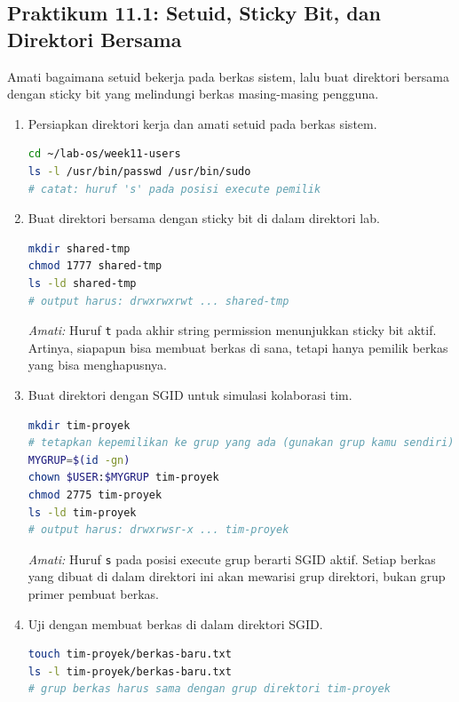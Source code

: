 \subsection*{Praktikum 11.1: Setuid, Sticky Bit, dan Direktori Bersama}

Amati bagaimana setuid bekerja pada berkas sistem, lalu buat direktori bersama dengan sticky bit yang melindungi berkas masing-masing pengguna.

\begin{enumerate}
    \item Persiapkan direktori kerja dan amati setuid pada berkas sistem.
\begin{lstlisting}[language=bash, caption={Amati setuid pada berkas sistem}]
cd ~/lab-os/week11-users
ls -l /usr/bin/passwd /usr/bin/sudo
# catat: huruf 's' pada posisi execute pemilik
\end{lstlisting}

    \item Buat direktori bersama dengan sticky bit di dalam direktori lab.
\begin{lstlisting}[language=bash, caption={Direktori bersama dengan sticky bit}]
mkdir shared-tmp
chmod 1777 shared-tmp
ls -ld shared-tmp
# output harus: drwxrwxrwt ... shared-tmp
\end{lstlisting}

    \textit{Amati:} Huruf \texttt{t} pada akhir string permission menunjukkan sticky bit aktif. Artinya, siapapun bisa membuat berkas di sana, tetapi hanya pemilik berkas yang bisa menghapusnya.

    \item Buat direktori dengan SGID untuk simulasi kolaborasi tim.
\begin{lstlisting}[language=bash, caption={Direktori tim dengan SGID}]
mkdir tim-proyek
# tetapkan kepemilikan ke grup yang ada (gunakan grup kamu sendiri)
MYGRUP=$(id -gn)
chown $USER:$MYGRUP tim-proyek
chmod 2775 tim-proyek
ls -ld tim-proyek
# output harus: drwxrwsr-x ... tim-proyek
\end{lstlisting}

    \textit{Amati:} Huruf \texttt{s} pada posisi execute grup berarti SGID aktif. Setiap berkas yang dibuat di dalam direktori ini akan mewarisi grup direktori, bukan grup primer pembuat berkas.

    \item Uji dengan membuat berkas di dalam direktori SGID.
\begin{lstlisting}[language=bash, caption={Verifikasi pewarisan grup}]
touch tim-proyek/berkas-baru.txt
ls -l tim-proyek/berkas-baru.txt
# grup berkas harus sama dengan grup direktori tim-proyek
\end{lstlisting}
\end{enumerate}

